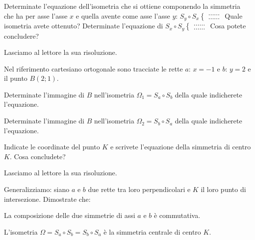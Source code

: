\begin{exrig}
\begin{esempio}
Determinate l'equazione dell'isometria che si ottiene componendo la simmetria che ha per asse l'asse $x$ e quella avente come asse l'asse $y$: $S_y \circ S_x\begin{cases}\ldots\ldots{}\\\ldots\ldots{}\end{cases}$ Quale isometria avete ottenuto?
Determinate l'equazione di $S_x \circ S_y\begin{cases}\ldots\ldots{}\\\ldots\ldots{}\end{cases}$ Cosa potete concludere?\vspace{7pt}
			
Lasciamo al lettore la sua risoluzione.
\end{esempio}

\noindent\begin{minipage}{0.6\textwidth}\parindent15pt
\begin{esempio}
Nel riferimento cartesiano ortogonale sono tracciate le rette $a$: $x=-1$ e $b$: $y=2$ e il punto $B(2;1)$.


\begin{enumerate*}
\item Determinate l'immagine di $B$ nell'isometria $\Omega_1 = S_a \circ S_b$ della quale indicherete l'equazione.
\item Determinate l'immagine di $B$ nell'isometria $\Omega_2 = S_b \circ S_a$ della quale indicherete l'equazione.
\item Indicate le coordinate del punto $K$ e scrivete l'equazione della simmetria di centro $K$. Cosa concludete?
\end{enumerate*}

Lasciamo al lettore la sua risoluzione.
\end{esempio}
\end{minipage}\hfil
\begin{minipage}{0.4\textwidth}
	\centering
\end{minipage}\vspace{8pt}
\end{exrig}

Generalizziamo: siano $a$ e $b$ due rette tra loro perpendicolari e $K$ il loro punto di intersezione. Dimostrate che:
\begin{itemize*}
\item La composizione delle due simmetrie di assi $a$ e $b$ è commutativa.
\item L'isometria $\Omega = S_a\circ S_b = S_b \circ S_a$ è la simmetria centrale di centro $K$.
\end{itemize*}

